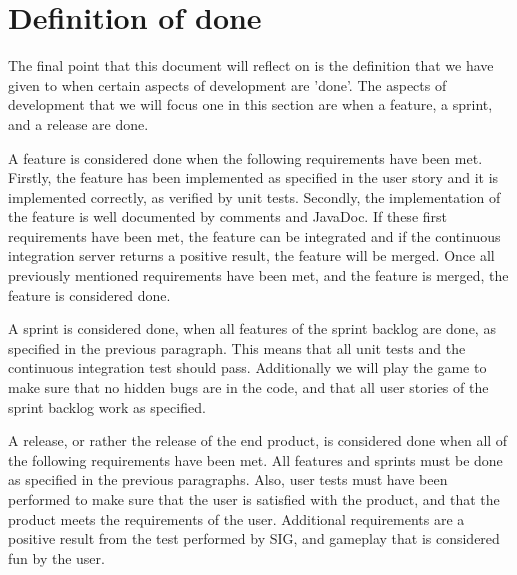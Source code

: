 \documentclass{article}
\begin{document}
\section{Definition of done}
The final point that this document will reflect on is the definition that we have given to when certain aspects of development are 'done'. The aspects of development that we will focus one in this section are when a feature, a sprint, and a release are done.

A feature is considered done when the following requirements have been met. Firstly, the feature has been implemented as specified in the user story and it is implemented correctly, as verified by unit tests. Secondly, the implementation of the feature is well documented by comments and JavaDoc. If these first requirements have been met, the feature can be integrated and if the continuous integration server returns a positive result, the feature will be merged. Once all previously mentioned requirements have been met, and the feature is merged, the feature is considered done.

A sprint is considered done, when all features of the sprint backlog are done, as specified in the previous paragraph. This means that all unit tests and the continuous integration test should pass. Additionally we will play the game to make sure that no hidden bugs are in the code, and that all user stories of the sprint backlog work as specified.

A release, or rather the release of the end product, is considered done when all of the following requirements have been met. All features and sprints must be done as specified in the previous paragraphs. Also, user tests must have been performed to make sure that the user is satisfied with the product, and that the product meets the requirements of the user. Additional requirements are a positive result from the test performed by SIG, and gameplay that is considered fun by the user.
\end{document}
